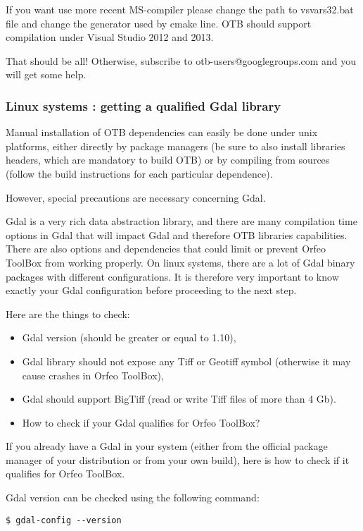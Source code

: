 If you want use more recent MS-compiler please change the path to vsvars32.bat file and change the generator used by cmake line. OTB should support compilation under Visual Studio 2012 and 2013. 

That should be all! Otherwise, subscribe to otb-users@googlegroups.com and you will get some help.



\subsubsection{Linux systems : getting a qualified Gdal library }
\label{sec:gdal}
Manual installation of OTB dependencies can easily be done under unix platforms, either directly by package managers (be sure to also install libraries headers, which are mandatory to build OTB) or by compiling from sources (follow the build instructions for each particular dependence).

However, special precautions are necessary concerning Gdal.
    
Gdal is a very rich data abstraction library, and there are many compilation time options in Gdal that will impact Gdal and therefore OTB libraries capabilities. There are also options and dependencies that could limit or prevent Orfeo ToolBox from working properly. On linux systems, there are a lot of Gdal binary packages with different configurations. It is therefore very important to know exactly your Gdal configuration before proceeding to the next step.

Here are the things to check:
\begin{itemize}
	\item Gdal version (should be greater or equal to 1.10),
	\item Gdal library should not expose any Tiff or Geotiff symbol (otherwise it may cause crashes in Orfeo ToolBox),
	\item Gdal should support BigTiff (read or write Tiff files of more than 4 Gb).
\end{itemize}

\begin{itemize}
	\item {How to check if your Gdal qualifies for Orfeo ToolBox?}
\end{itemize}
If you already have a Gdal in your system (either from the official package manager of your distribution or from your own build), here is how to check if it qualifies for Orfeo ToolBox.

Gdal version can be checked using the following command:
\begin{verbatim}
$ gdal-config --version
\end{verbatim}


